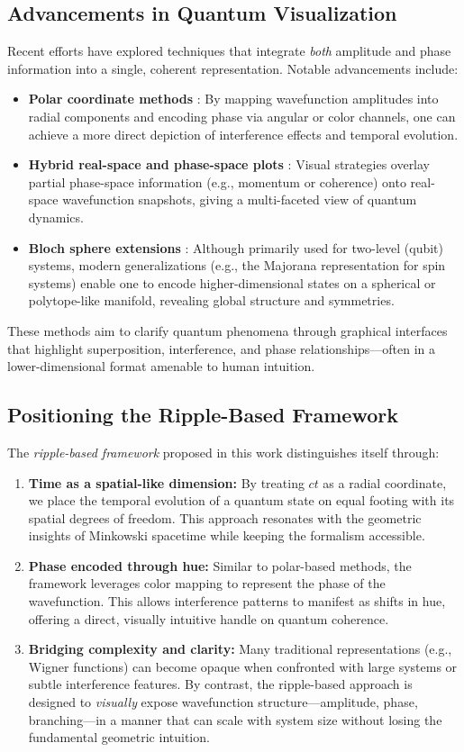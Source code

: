 \documentclass{article}
\begin{document}
\subsection{Advancements in Quantum Visualization}
Recent efforts have explored techniques that integrate \emph{both} amplitude and phase information into a single, coherent representation. Notable advancements include:
\begin{itemize}
    \item \textbf{Polar coordinate methods} \citep{glauber1963, susskind2009}: 
    By mapping wavefunction amplitudes into radial components and encoding phase via angular or color channels, one can achieve a more direct depiction of interference effects and temporal evolution.
    \item \textbf{Hybrid real-space and phase-space plots} \citep{schleich2001quantum}: 
    Visual strategies overlay partial phase-space information (e.g., momentum or coherence) onto real-space wavefunction snapshots, giving a multi-faceted view of quantum dynamics.
    \item \textbf{Bloch sphere extensions} \citep{nielsenchuang2000}: 
    Although primarily used for two-level (qubit) systems, modern generalizations (e.g., the Majorana representation for spin systems) enable one to encode higher-dimensional states on a spherical or polytope-like manifold, revealing global structure and symmetries.
\end{itemize}
These methods aim to clarify quantum phenomena through graphical interfaces that highlight superposition, interference, and phase relationships—often in a lower-dimensional format amenable to human intuition.

\subsection{Positioning the Ripple-Based Framework}
The \emph{ripple-based framework} proposed in this work distinguishes itself through:
\begin{enumerate}
    \item \textbf{Time as a spatial-like dimension:} 
    By treating $ct$ as a radial coordinate, we place the temporal evolution of a quantum state on equal footing with its spatial degrees of freedom. This approach resonates with the geometric insights of Minkowski spacetime while keeping the formalism accessible.
    \item \textbf{Phase encoded through hue:} 
    Similar to polar-based methods, the framework leverages color mapping to represent the phase of the wavefunction. This allows interference patterns to manifest as shifts in hue, offering a direct, visually intuitive handle on quantum coherence.
    \item \textbf{Bridging complexity and clarity:} 
    Many traditional representations (e.g., Wigner functions) can become opaque when confronted with large systems or subtle interference features. By contrast, the ripple-based approach is designed to \emph{visually} expose wavefunction structure—amplitude, phase, branching—in a manner that can scale with system size without losing the fundamental geometric intuition.
\end{enumerate}
\end{document}
